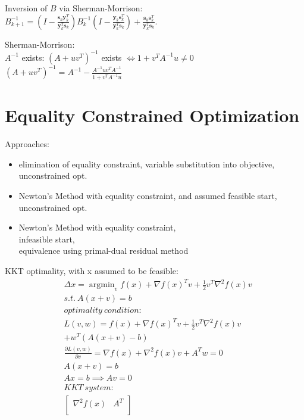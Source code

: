 \message{ !name(notebook.tex)}\documentclass[8pt]{report}
\DeclareMathOperator*{\argmin}{argmin}
\begin{document}
\begin{multicols*}{2}
  Inversion of $B$ via Sherman-Morrison:\\
  ${\displaystyle B_{k+1}^{-1}=\left(I-{\frac {\mathbf {s} _{k}\mathbf {y} _{k}^{T}}{\mathbf {y} _{k}^{T}\mathbf {s} _{k}}}\right)B_{k}^{-1}\left(I-{\frac {\mathbf {y} _{k}\mathbf {s} _{k}^{T}}{\mathbf {y} _{k}^{T}\mathbf {s} _{k}}}\right)+{\frac {\mathbf {s} _{k}\mathbf {s} _{k}^{T}}{\mathbf {y} _{k}^{T}\mathbf {s} _{k}}}.}$

  Sherman-Morrison:\\
  $A^{-1}$ exists: $(A+uv^T)^{-1}$ exists $\iff 1+v^TA^{-1}u \not=0$\\
  $(A+uv^T)^{-1}=A^{-1} - \frac{A^{-1}uv^T A^{-1}}{1+v^TA^{-1}u}$\\
  
  \vfill\null
  \pagebreak
  \section{Equality Constrained Optimization}
  Approaches:
  \begin{itemize}
  \item elimination of equality constraint, variable substitution into objective, unconstrained opt.
  \item Newton's Method with equality constraint, and assumed feasible start, unconstrained opt.
  \item Newton's Method with equality constraint,\\ infeasible start,\\ equivalence using primal-dual residual method
  \end{itemize}  
  KKT optimality, with x assumed to be feasible:
  \begin{align*}
    &\Delta x = \argmin_v f(x) + \nabla f(x)^T v + \frac{1}{2} v^T \nabla^2 f(x) v\\
    &s.t.\ A(x+v)=b\\
    &optimality\ condition:\\
    &L(v,w) = f(x) + \nabla f(x)^T v + \frac{1}{2} v^T \nabla^2 f(x) v\\
    &+ w^T(A(x+v)-b)\\
    &\frac{\partial L(v,w)}{\partial v} = \nabla f(x) + \nabla^2 f(x) v + A^T w = 0\\
    &A(x+v) = b\\
    &Ax = b \implies Av = 0\\
    & KKT\ system:\\
    &\begin{bmatrix}
        \nabla^2 f(x) & A^T \\

\end{bmatrix}
\end{align*}
\end{multicols*}
\end{document}
